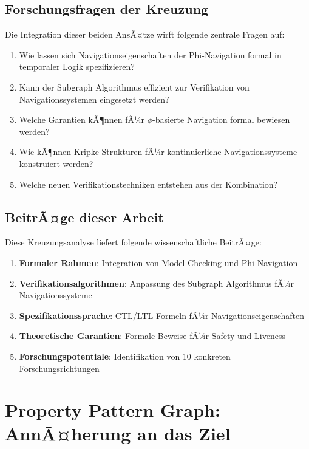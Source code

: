 ﻿\documentclass[a4paper,12pt]{article}
\theoremstyle{definition}
\begin{document}
\subsection{Forschungsfragen der Kreuzung}

Die Integration dieser beiden AnsÃ¤tze wirft folgende zentrale Fragen auf:

\begin{enumerate}
	\item Wie lassen sich Navigationseigenschaften der Phi-Navigation formal in temporaler Logik spezifizieren?
	\item Kann der Subgraph Algorithmus effizient zur Verifikation von Navigationssystemen eingesetzt werden?
	\item Welche Garantien kÃ¶nnen fÃ¼r $\phi$-basierte Navigation formal bewiesen werden?
	\item Wie kÃ¶nnen Kripke-Strukturen fÃ¼r kontinuierliche Navigationssysteme konstruiert werden?
	\item Welche neuen Verifikationstechniken entstehen aus der Kombination?
\end{enumerate}

\subsection{BeitrÃ¤ge dieser Arbeit}

Diese Kreuzungsanalyse liefert folgende wissenschaftliche BeitrÃ¤ge:

\begin{enumerate}
	\item \textbf{Formaler Rahmen}: Integration von Model Checking und Phi-Navigation
	\item \textbf{Verifikationsalgorithmen}: Anpassung des Subgraph Algorithmus fÃ¼r Navigationssysteme
	\item \textbf{Spezifikationssprache}: CTL/LTL-Formeln fÃ¼r Navigationseigenschaften
	\item \textbf{Theoretische Garantien}: Formale Beweise fÃ¼r Safety und Liveness
	\item \textbf{Forschungspotentiale}: Identifikation von 10 konkreten Forschungsrichtungen
\end{enumerate}


\section{Property Pattern Graph: AnnÃ¤herung an das Ziel}\label{sec:tikz}
\end{document}
